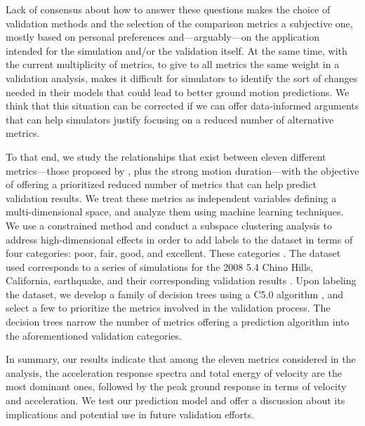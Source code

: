 Lack of consensus about how to answer these questions makes the choice of validation methods and the selection of the comparison metrics a subjective one, mostly based on personal preferences and---arguably---on the application intended for the simulation and/or the validation itself. At the same time, with the current multiplicity of metrics, to give to all metrics the same weight in a validation analysis, makes it difficult for simulators to identify the sort of changes needed in their models that could lead to better ground motion predictions. We think that this situation can be corrected if we can offer data-informed arguments that can help simulators justify focusing on a reduced number of alternative metrics.

To that end, we study the relationships that exist between eleven different metrics---those proposed by \citet{Anderson_2004_Proc}, plus the strong motion duration---with the objective of offering a prioritized reduced number of metrics that can help predict validation results. We treat these metrics as independent variables defining a multi-dimensional space, and analyze them using machine learning techniques. We use a constrained \kmeans{} method \citep[e.g.,][]{Macqueen_1967_Proc, Wagstaff_2001_Proc} and conduct a subspace clustering analysis to address high-dimensional effects in order to add labels to the dataset in terms of four categories: poor, fair, good, and excellent. These categories  .  The dataset used corresponds to a series of simulations for the 2008  5.4 Chino Hills, California, earthquake, and their corresponding validation results \citep{Taborda_2014_BSSA}. Upon labeling the dataset, we develop a family of decision trees using a C5.0 algorithm \citep[][]{Quinlan_1993_Book, Quinlan_1996_JAIR}, and select a few to prioritize the metrics involved in the validation process. The decision trees narrow the number of metrics offering a prediction algorithm into the aforementioned validation categories. 

In summary, our results indicate that  among the eleven metrics considered in the analysis, the acceleration response spectra and total energy of velocity are the most dominant ones, followed by the peak ground response in terms of velocity and acceleration. We test our prediction model and offer a discussion about its implications and potential use in future validation efforts.
